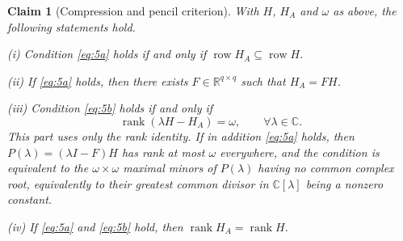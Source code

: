 \documentclass[journal]{IEEEtran}
\theoremstyle{plainn}
\newtheorem{claim}{Claim}
\theoremstyle{remark}
\begin{document}
\begin{claim}[Compression and pencil criterion]\label{lem:compression}
With $H$, $H_A$ and $\omega$ as above, the following statements hold.

(i) Condition \eqref{eq:5a} holds if and only if $\operatorname{row}H_A\subseteq\operatorname{row}H$.

(ii) If \eqref{eq:5a} holds, then there exists $F\in\mathbb R^{q\times q}$ such that $H_A=FH$.

(iii) Condition \eqref{eq:5b} holds if and only if
\begin{equation*}
\operatorname{rank}(\lambda H-H_A)=\omega,\qquad \forall\lambda\in\mathbb C .
\end{equation*}
This part uses only the rank identity. If in addition \eqref{eq:5a} holds, then
$P(\lambda)=(\lambda I-F)H$ has rank at most $\omega$ everywhere, and the condition is equivalent to
the $\omega\times\omega$ maximal minors of $P(\lambda)$ having no common complex root, equivalently to
their greatest common divisor in $\mathbb C[\lambda]$ being a nonzero constant.

(iv) If \eqref{eq:5a} and \eqref{eq:5b} hold, then $\operatorname{rank}H_A=\operatorname{rank}H$.
\end{claim}
\end{document}

